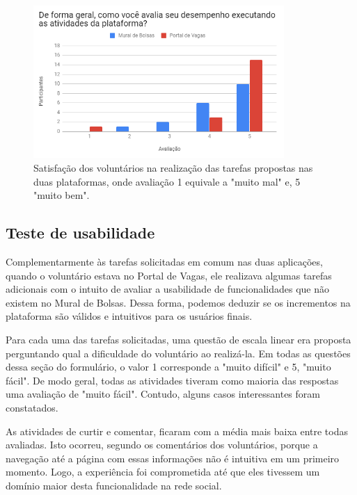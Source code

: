 \begin{figure}[H]
    \caption{Satisfação dos voluntários na realização das tarefas propostas nas duas plataformas, onde avaliação 1 equivale a "muito mal" e, 5 "muito bem".}
       	\begin{center}
            \includegraphics[width=0.85\textwidth]{figuras/avaliacao/ab-desempenho.png}
        \end{center}
    \label{avalGrafABSatisfacao}
\end{figure} 

\subsection{Teste de usabilidade}
\label {avaliacaoUsabilidade}

Complementarmente às tarefas solicitadas em comum nas duas aplicações, quando o voluntário estava no Portal de Vagas, ele realizava algumas tarefas adicionais com o intuito de avaliar a usabilidade de funcionalidades que não existem no Mural de Bolsas. Dessa forma, podemos deduzir se os incrementos na plataforma são válidos e intuitivos para os usuários finais.

Para cada uma das tarefas solicitadas, uma questão de escala linear era proposta perguntando qual a dificuldade do voluntário ao realizá-la. Em todas as questões dessa seção do formulário, o valor 1 corresponde a "muito difícil" e 5, "muito fácil". De modo geral, todas as atividades tiveram como maioria das respostas uma avaliação de "muito fácil". Contudo, alguns casos interessantes foram constatados. 

As atividades de curtir e comentar, ficaram com a média mais baixa entre todas avaliadas. Isto ocorreu, segundo os comentários dos voluntários, porque a navegação até a página com essas informações não é intuitiva em um primeiro momento. Logo, a experiência foi comprometida até que eles tivessem um domínio maior desta funcionalidade na rede social.

